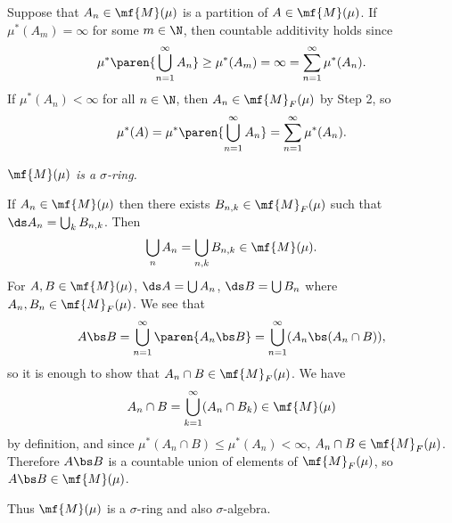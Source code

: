 Suppose that \(A_n \in \mf{M}(\mu)\) is a partition of \(A \in \mf{M}(\mu)\). If \(\mu^\ast(A_m) = \infty\) for some \(m \in \N\), then countable additivity holds since
\[
    \mu^\ast\paren{\bigcup_{n=1}^\infty A_n} \geq \mu^\ast(A_m) = \infty = \sum_{n=1}^\infty \mu^\ast(A_n).
\]
If \(\mu^\ast(A_n) < \infty\) for all \(n\in \N\), then \(A_n \in \mf{M}_F(\mu)\) by {\sffamily Step 2}, so
\[
    \mu^\ast(A) = \mu^\ast\paren{\bigcup_{n=1}^\infty A_n} = \sum_{n=1}^\infty \mu^\ast(A_n).
\]

 \textit{\(\mf{M}(\mu)\) is a \(\sigma\)-ring.}

If \(A_n \in \mf{M}(\mu)\) then there exists \(B_{n, k} \in \mf{M}_F(\mu)\) such that \(\ds A_n = \bigcup_k B_{n,k}\). Then
\[
    \bigcup_n A_n = \bigcup_{n, k} B_{n, k} \in \mf{M}(\mu).
\]
For \(A, B \in \mf{M}(\mu)\), \(\ds A = \bigcup A_n\), \(\ds B = \bigcup B_n\) where \(A_n, B_n \in \mf{M}_F(\mu)\). We see that
\[
    A \bs B = \bigcup_{n=1}^\infty \paren{A_n \bs B} = \bigcup_{n=1}^\infty (A_n\bs(A_n\cap B)),
\]
so it is enough to show that \(A_n \cap B \in \mf{M}_F(\mu)\). We have
\[
    A_n \cap B = \bigcup_{k=1}^\infty (A_n \cap B_k) \in \mf{M}(\mu)
\]
by definition, and since \(\mu^\ast(A_n \cap B) \leq \mu^\ast(A_n) < \infty\), \(A_n\cap B \in \mf{M}_F(\mu)\). Therefore \(A \bs B\) is a countable union of elements of \(\mf{M}_F(\mu)\), so \(A\bs B \in \mf{M}(\mu)\).

Thus \(\mf{M}(\mu)\) is a \(\sigma\)-ring and also \(\sigma\)-algebra.

\pagebreak
